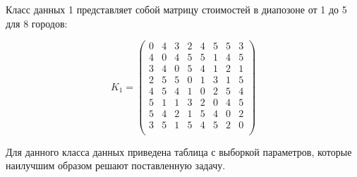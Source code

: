 Класс данных 1 представляет собой матрицу стоимостей в диапозоне от 1 до 5 для 8 городов:

\begin{equation}
    \label{eq:kd1}
	K_{1} = \begin{pmatrix}
		0 & 4 & 3 & 2 & 4 & 5 & 5 & 3 \\
		4 & 0 & 4 & 5 & 5 & 1 & 4 & 5 \\
		3 & 4 & 0 & 5 & 4 & 1 & 2 & 1 \\
		2 & 5 & 5 & 0 & 1 & 3 & 1 & 5 \\
		4 & 5 & 4 & 1 & 0 & 2 & 5 & 4 \\
		5 & 1 & 1 & 3 & 2 & 0 & 4 & 5 \\
		5 & 4 & 2 & 1 & 5 & 4 & 0 & 2 \\
		3 & 5 & 1 & 5 & 4 & 5 & 2 & 0 \\
	\end{pmatrix}
\end{equation}

Для данного класса данных приведена таблица с выборкой параметров, которые наилучшим образом решают поставленную задачу.

